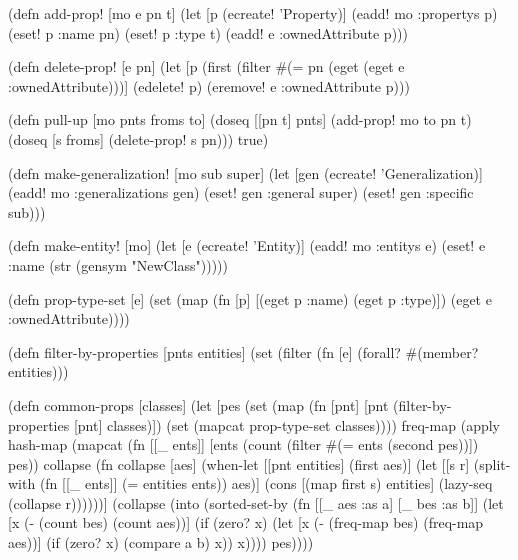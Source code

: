 \documentclass[submission]{eptcs}
\begin{document}
\begin{clojurecode}
(defn add-prop! [mo e pn t]
  (let [p (ecreate! 'Property)]
    (eadd! mo :propertys p)
    (eset! p :name pn)
    (eset! p :type t)
    (eadd! e :ownedAttribute p)))

(defn delete-prop! [e pn]
  (let [p (first (filter #(= pn (eget %
                         (eget e :ownedAttribute)))]
    (edelete! p)
    (eremove! e :ownedAttribute p)))

(defn pull-up [mo pnts froms to]
  (doseq [[pn t] pnts]
    (add-prop! mo to pn t)
    (doseq [s froms]
      (delete-prop! s pn)))
  true)

(defn make-generalization! [mo sub super]
  (let [gen (ecreate! 'Generalization)]
    (eadd! mo :generalizations gen)
    (eset! gen :general super)
    (eset! gen :specific sub)))

(defn make-entity! [mo]
  (let [e (ecreate! 'Entity)]
    (eadd! mo :entitys e)
    (eset! e :name (str (gensym "NewClass")))))

(defn prop-type-set [e]
  (set (map (fn [p] [(eget p :name) (eget p :type)])
            (eget e :ownedAttribute))))

(defn filter-by-properties [pnts entities]
  (set (filter (fn [e]
                 (forall? #(member? %
               entities)))

(defn common-props [classes]
  (let [pes (set (map (fn [pnt]
                        [pnt (filter-by-properties [pnt] classes)])
                      (set (mapcat prop-type-set classes))))
        freq-map (apply hash-map
                        (mapcat (fn [[_ ents]]
                                  [ents (count (filter #(= ents (second %
                                                       pes))])
                                pes))
        collapse (fn collapse [aes]
                   (when-let [[pnt entities] (first aes)]
                     (let [[s r] (split-with (fn [[_ ents]]
                                               (= entities ents)) aes)]
                       (cons [(map first s) entities]
                             (lazy-seq (collapse r))))))]
    (collapse (into (sorted-set-by
                     (fn [[_ aes :as a] [_ bes :as b]]
                       (let [x (- (count bes) (count aes))]
                         (if (zero? x)
                           (let [x (- (freq-map bes) (freq-map aes))]
                             (if (zero? x)
                               (compare a b)
                               x))
                           x))))
                    pes))))


\end{clojurecode}
\end{document}
